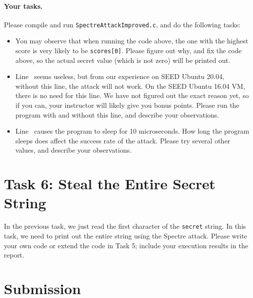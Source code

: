 \paragraph{Your tasks.} Please compile and run \texttt{SpectreAttackImproved.c},
and do the following tasks:

\begin{itemize}
  \item You may observe that when running the code above, 
        the one with the highest score is very likely to be 
        \texttt{scores[0]}. Please figure out why, and fix the code above,
        so the actual secret value (which is not zero) will be printed out. 
	
  \item Line~ seems useless, but from our experience on SEED Ubuntu 20.04, without this line,
        the attack will not work. On the SEED Ubuntu 16.04 VM, there is no need for this line. 
	We have not figured out the exact reason yet, so if you can, your instructor will
	likely give you bonus points. 
	Please run the program with and without this line, and describe your observations. 

  \item Line~ causes the program to sleep for 10 microseconds. How long the program
        sleeps does affect the success rate of the attack. Please try several other values,
	and describe your observations. 
\end{itemize}
 



\section{Task 6: Steal the Entire Secret String}

In the previous task, we  just read the first character of the \texttt{secret}
string. In this task, we need to print out the entire string using the 
Spectre attack. Please write your own code or extend the code in Task 5; include your
execution results in the report.


\section{Submission}





\def\baselinestretch{1}





